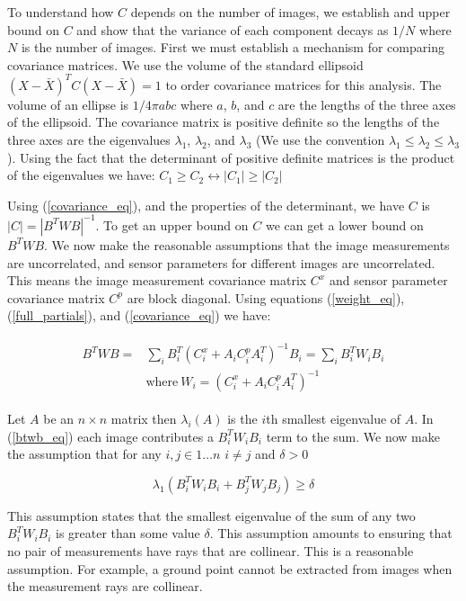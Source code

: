 \documentclass[]{article}
\newcommand{\btwbi}{B^T_iW_iB_i}
\begin{document}
To understand how $C$ depends on the number of images, we establish and upper bound on $C$ and show that the variance of each component decays as $1/N$ where $N$ is the number of images.  First we must establish a mechanism for comparing covariance matrices.  We use the volume of the standard ellipsoid $(X - \bar{X})^TC(X - \bar{X}) = 1$ to order covariance matrices for this analysis.  The volume of an ellipse is $1/4 \pi abc$ where $a$, $b$, and $c$ are the lengths of the three axes of the ellipsoid.  The covariance matrix is positive definite so the lengths of the three axes are the eigenvalues $\lambda_1$, $\lambda_2$, and $\lambda_3$ (We use the convention $\lambda_1 \le \lambda_2 \le \lambda_3$).  Using the fact that the determinant of positive definite matrices is the product of the eigenvalues we have: $C_1 \ge C_2 \leftrightarrow |C_1| \ge |C_2|$

Using (\ref{covariance_eq}), and the properties of the determinant, we have $C$ is $|C| = |B^TWB|^{-1}$.  To get an upper bound on $C$ we can get a lower bound on $B^TWB$.  We now make the reasonable assumptions that the image measurements are uncorrelated, and sensor parameters for different images are uncorrelated.  This means the image measurement covariance matrix $C^x$ and sensor parameter covariance matrix $C^p$ are block diagonal.  Using equations (\ref{weight_eq}), (\ref{full_partials}), and (\ref{covariance_eq}) we have:

\begin{align}\label{btwb_eq}
\begin{aligned}
B^TWB =  & \sum_{i}B^T_i(C^x_i + A_iC^p_iA^T_i)^{-1}B_i = \sum_{i}B^T_iW_iB_i \\
& \text{where}\ W_i = (C^x_i + A_iC^p_iA^T_i)^{-1}
\end{aligned}
\end{align}

Let $A$ be an $n\times n$ matrix then $\lambda_i(A)$ is the $i$th smallest eigenvalue of $A$.  In (\ref{btwb_eq}) each image contributes a $\btwbi$ term to the sum.  We now make the assumption that for any $i, j \in 1\dots n$  $i \ne j$ and $\delta > 0$

\begin{equation}\label{w_assumption_eq}
\lambda_1(B^T_iW_iB_i + B^T_jW_jB_j)  \geq \delta
\end{equation}

This assumption states that the smallest eigenvalue of the sum of any two $\btwbi$ is greater than some value $\delta$.  This assumption amounts to ensuring that no pair of measurements have rays that are collinear.  This is a reasonable assumption.  For example, a ground point cannot be extracted from images when the measurement rays are collinear. 
\end{document}
